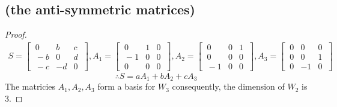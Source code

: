 \documentclass[../main.tex]{subfiles}
\begin{document}
\subsection{ (the anti-symmetric matrices)}
\begin{proof}
        \begin{align*}
                S = \begin{bmatrix}
                        \ 0  & b  & c \ \\
                        \ -b & 0  & d \ \\
                        \ -c & -d & 0 \
                \end{bmatrix},
                A_{1} = \begin{bmatrix}
                        \ 0  & 1 & 0 \ \\
                        \ -1 & 0 & 0 \ \\
                        \ 0  & 0 & 0 \
                \end{bmatrix},
                A_{2} = \begin{bmatrix}
                        \ 0  & 0 & 1 \ \\
                        \ 0  & 0 & 0 \ \\
                        \ -1 & 0 & 0 \
                \end{bmatrix},
                A_{3} = \begin{bmatrix}
                        \ 0 & 0  & 0 \ \\
                        \ 0 & 0  & 1 \ \\
                        \ 0 & -1 & 0 \
                \end{bmatrix}
        \end{align*}
        $$\therefore S= aA_{1}+bA_{2}+cA_{3}$$
        The matricies $A_{1},A_{2},A_{3}$ form a basis for $W_3$ consequently, the dimension of $W_2$ is $3$.
\end{proof}
\end{document}
